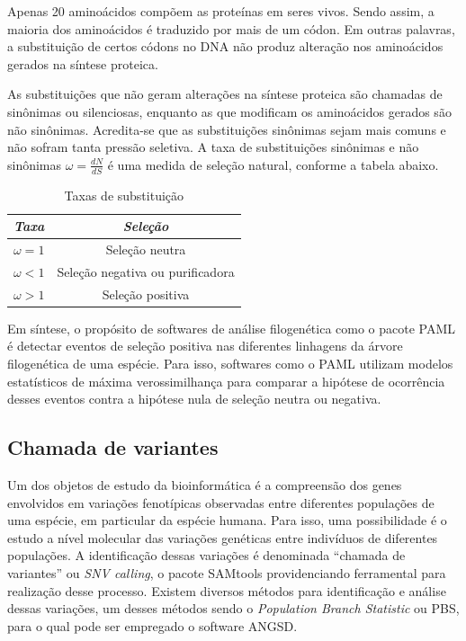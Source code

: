 \documentclass[cic,tc]{iiufrgs}
\begin{document}
Apenas 20 aminoácidos compõem as proteínas em seres vivos. Sendo assim, a
maioria dos aminoácidos é traduzido por mais de um códon. Em outras palavras, a
substituição de certos códons no DNA não produz alteração nos aminoácidos
gerados na síntese proteica.

As substituições que não geram alterações na síntese proteica são chamadas de
sinônimas ou silenciosas, enquanto as que modificam os aminoácidos gerados são
não sinônimas. Acredita-se que as substituições sinônimas sejam mais comuns e
não sofram tanta pressão seletiva. A taxa de substituições sinônimas e não
sinônimas $\omega = \frac{dN}{dS}$ é uma medida de seleção natural, conforme a
tabela abaixo.\cite{yang2002codon}

\begin{table}[h]
    \caption{Taxas de substituição}
    \centering
        \begin{tabular}{c|c}
          \hline
          \textit{Taxa}  &   \textit{Seleção} \\
          \hline
          \hline
          $\omega = 1$ & Seleção neutra \\
          $\omega < 1$ & Seleção negativa ou purificadora \\
          $\omega > 1$ & Seleção positiva \\
          \hline
        \end{tabular}
    \label{tbl:ex1}
\end{table}

Em síntese, o propósito de softwares de análise filogenética como o pacote PAML
é detectar eventos de seleção positiva nas diferentes linhagens da árvore
filogenética de uma espécie. Para isso, softwares como o PAML utilizam modelos
estatísticos de máxima verossimilhança para comparar a hipótese de ocorrência
desses eventos contra a hipótese nula de seleção neutra ou
negativa.\cite{moretti2012gcodeml}

\subsection{Chamada de variantes}
\label{sec:call}

Um dos objetos de estudo da bioinformática é a compreensão dos genes envolvidos
em variações fenotípicas observadas entre diferentes populações de uma
espécie, em particular da espécie humana.\cite{jiang2019population} Para isso,
uma possibilidade é o estudo a nível molecular das variações genéticas entre
indivíduos de diferentes populações. A identificação dessas variações é
denominada ``chamada de variantes'' ou \textit{SNV calling}, o pacote SAMtools
providenciando ferramental para realização desse
processo.\cite{pirooznia2014validation} Existem diversos métodos para
identificação e análise dessas variações, um desses métodos sendo o
\textit{Population Branch Statistic} ou PBS,\cite{jiang2019population} para o
qual pode ser empregado o software ANGSD.
\end{document}
